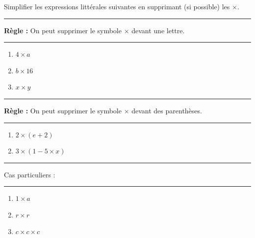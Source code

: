 \documentclass[activite]{thedocument}
\begin{document}
    \begin{flushleft}
        Simplifier les expressions littérales suivantes en supprimant (si possible) les $\times$.
    \end{flushleft}
    \hrule\vskip10pt\par
        \textbf{Règle : }On peut supprimer le symbole $\times$ devant une
        lettre.
    \vskip10pt\hrule
    \begin{enumerate}
        \item $4\times a$\vskip30pt
        \item $b\times 16$\vskip30pt
        \item $x\times y$\vskip30pt
    \end{enumerate}
    \hrule\vskip10pt\par
        \textbf{Règle : }On peut supprimer le symbole $\times$ devant des
        parenthèses.
        \vskip10pt\hrule
    \begin{enumerate}
        \item $2\times(e+2)$\vskip30pt
        \item $3\times(1-5\times x)$\vskip30pt
    \end{enumerate}
    \hrule\vskip10pt\par
        \centering Cas particuliers :
        \vskip10pt\hrule
    \begin{enumerate}
        \item $1\times a$\vskip30pt
        \item $r\times r$\vskip30pt
        \item $c\times c\times c$
    \end{enumerate}
\end{document}
